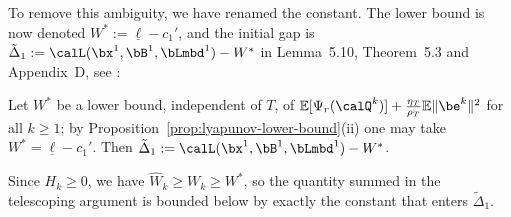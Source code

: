 \begin{itemize}
To remove this ambiguity, we have renamed the constant. The lower bound is now denoted $W^*:=\underline{\ell}-c_1'$, and the initial gap is $\tilde\Delta_1:=\calL(\bx^1,\bB^1,\bLmbd^1)-W^*$ in Lemma~5.10, Theorem~5.3 and Appendix~D, see :
\begin{bluequote}
Let $W^*$ be a lower bound, independent of $T$, of $\mathbb{E}[\Psi_r(\calQ^k)]+\frac{\eta_T}{\rho_T}\mathbb{E}\|\be^k\|^2$ for all $k\ge1$; by Proposition~\ref{prop:lyapunov-lower-bound}(ii) one may take $W^*=\underline{\ell}-c_1'$. Then $\tilde\Delta_1:=\calL(\bx^1,\bB^1,\bLmbd^1)-W^*$.
\end{bluequote}
Since $H_k\ge0$, we have $\widehat W_k\ge W_k\ge W^*$, so the quantity summed in the telescoping argument is bounded below by exactly the constant that enters $\tilde\Delta_1$.
\end{itemize}
